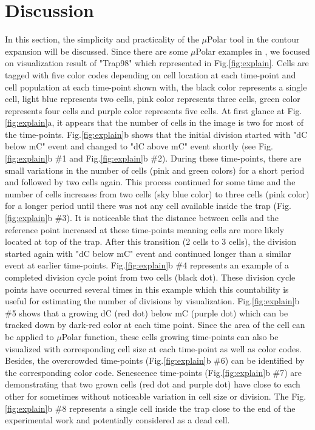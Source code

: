 \documentclass[conference]{IEEEtran}
\begin{document}
\section{Discussion}
In this section, the simplicity and practicality of the $\mu$Polar tool in the contour expansion will be discussed. Since there are some $\mu$Polar examples in , we focused on visualization result of "Trap98" which represented in Fig.\ref{fig:explain}.
Cells are tagged with five color codes depending on cell location at each time-point and cell population at each time-point shown with, the black color represents a single cell, light blue represents two cells, pink color represents three cells, green color represents four cells and purple color represents five cells. At first glance at Fig.\ref{fig:explain}a, it appears that the number of cells in the image is two for most of the time-points. Fig.\ref{fig:explain}b shows that the initial division started with "dC below mC" event and changed to "dC above mC" event shortly (see Fig.\ref{fig:explain}b \#1 and Fig.\ref{fig:explain}b \#2). During these time-points, there are small variations in the number of cells (pink and green colors) for a short period and followed by two cells again. This process continued for some time and the number of cells increases from two cells (sky blue color) to three cells (pink color) for a longer period until there was not any cell available inside the trap (Fig.\ref{fig:explain}b \#3). It is noticeable that the distance between cells and the reference point increased at these time-points meaning cells are more likely located at top of the trap. After this transition (2 cells to 3 cells), the division started again with "dC below mC" event and continued longer than a similar event at earlier time-points. Fig.\ref{fig:explain}b \#4 represents an example of a completed division cycle point from two cells (black dot). These division cycle points have occurred several times in this example which this countability is useful for estimating the number of divisions by visualization. Fig.\ref{fig:explain}b \#5 shows that a growing dC (red dot) below mC (purple dot) which can be tracked down by dark-red color at each time point. Since the area of the cell can be applied to $\mu$Polar function, these cells growing time-points can also be visualized with corresponding cell size at each time-point as well as color codes. Besides, the overcrowded time-points (Fig.\ref{fig:explain}b \#6) can be identified by the corresponding color code. Senescence time-points (Fig.\ref{fig:explain}b \#7) are demonstrating that two grown cells (red dot and purple dot) have close to each other for sometimes without noticeable variation in cell size or division. The Fig.\ref{fig:explain}b \#8 represents a single cell inside the trap close to the end of the experimental work and potentially considered as a dead cell. 
\end{document}
